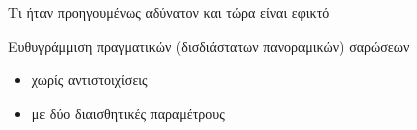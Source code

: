 \begin{frame}{Τι ήταν προηγουμένως αδύνατον και τώρα είναι εφικτό}

  Ευθυγράμμιση πραγματικών (δισδιάστατων πανοραμικών) σαρώσεων
  \begin{itemize}
    \item χωρίς αντιστοιχίσεις
    \item με δύο διαισθητικές παραμέτρους
  \end{itemize}



\end{frame}
